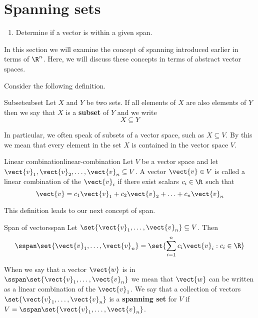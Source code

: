 \section{Spanning sets}

\begin{outcome}
  \begin{enumerate}
  \item Determine if a vector is within a given span.
  \end{enumerate}
\end{outcome}

In this section we will examine the concept of spanning introduced earlier in terms of $\R^n$. Here, we will discuss these concepts in terms of abstract vector spaces.

Consider the following definition.

\begin{definition}{Subset}{subset}
Let $X$ and $Y$ be two sets. If all elements of $X$ are also elements of $Y$ then we say that $X$ is a \textbf{subset} of $Y$ and we write
\[
X \subseteq Y
\]
\end{definition}

In particular, we often speak of subsets of a vector space, such as $X \subseteq V$. By this we mean that every element in the set $X$ is contained in the vector space $V$.

\begin{definition}{Linear combination}{linear-combination}
Let $V$ be a vector space and let $\vect{v}_1, \vect{v}_2,\ldots, \vect{v}_n \subseteq V$. A vector $\vect{v} \in V$ is called a linear combination of the $\vect{v}_i$ if there exist scalars $c_i \in \R$ such that
\[
\vect{v} = c_1 \vect{v}_1 + c_2 \vect{v}_2 + \ldots + c_n \vect{v}_n
\]
\end{definition}

This definition leads to our next concept of span.

\begin{definition}{Span of vectors}{span}
Let $\set{\vect{v}_{1},\ldots,\vect{v}_{n}} \subseteq V$. Then
\begin{equation*}
\sspan\set{\vect{v}_{1},\ldots,\vect{v}_{n}} =
\set{\sum_{i=1}^{n}c_{i}\vect{v}_{i}: c_{i}\in \R
}
\end{equation*}
\end{definition}

When we say that a vector $\vect{w}$ is in $\sspan\set{\vect{v}_{1},\ldots,\vect{v}_{n}}$ we mean that $\vect{w}$ can be written as a linear combination of the $\vect{v}_1$. We say that a collection of vectors $\set{\vect{v}_{1},\ldots,\vect{v}_{n}}$ is a \textbf{spanning set} for $V$ if $V = \sspan \set{\vect{v}_{1},\ldots,\vect{v}_{n}}$.

